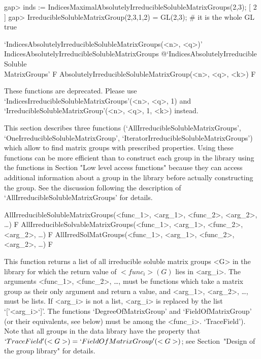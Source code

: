 \beginexample
gap> inds := IndicesMaximalAbsolutelyIrreducibleSolubleMatrixGroups(2,3);
[ 2 ] 
gap> IrreducibleSolubleMatrixGroup(2,3,1,2) = GL(2,3); # it is the whole GL
true
\endexample


\>`IndicesAbsolutelyIrreducibleSolubleMatrixGroups(<n>, <q>)'%
{IndicesAbsolutelyIrreducibleSolubleMatrixGroups}%
@{`IndicesAbsolutelyIrreducible\\Soluble\\MatrixGroups'} F
\>AbsolutelyIrreducibleSolubleMatrixGroup(<n>, <q>,  <k>) F

These functions are deprecated.  Please use `IndicesIrreducibleSolubleMatrixGroups'(<n>, <q>, 1) and `IrreducibleSolubleMatrixGroup'(<n>, <q>, 1, <k>) instead.



This section describes three functions
(`AllIrreducibleSolubleMatrixGroups',
`OneIrreducibleSolubleMatrixGroup',
`IteratorIrreducibleSolubleMatrixGroups') which allow to find matrix
groups with prescribed properties. Using these functions can be more efficient
than to construct each group in the library using the functions in Section
"Low level access functions" because they can access additional information 
about a group in the {\IRREDSOL} library before actually constructing the group. 
See the discussion following the description of 
`AllIrreducibleSolubleMatrixGroups' for details. 

\>AllIrreducibleSolubleMatrixGroups(<func_1>, <arg_1>, <func_2>, <arg_2>, \dots) F
\>AllIrreducibleSolvableMatrixGroups(<func_1>, <arg_1>, <func_2>, <arg_2>, \dots) F
\>AllIrredSolMatGroups(<func_1>, <arg_1>, <func_2>, <arg_2>, \dots) F

This function returns a list of all irreducible soluble matrix
groups <G> in the {\IRREDSOL} library for which the return value of $<func_i>(G)$ lies in
<arg_i>.  The arguments <func_1>, <func_2>, \dots,
must be {\GAP} functions which take a matrix group as their only argument and
return a value, and <arg_1>, <arg_2>,
\dots,  must be lists. If <arg_i> is not a list, <arg_i> is replaced by the list
`['<arg_i>`]'. The functions `DegreeOfMatrixGroup' and `FieldOfMatrixGroup' (or their equivalents, see below) must be among the <func_i>. 
`TraceField'). Note that all groups in the data library have the property that 
$`TraceField'(<G>) = `FieldOfMatrixGroup'(<G>)$; see Section~"Design of the group library" 
for details. 

